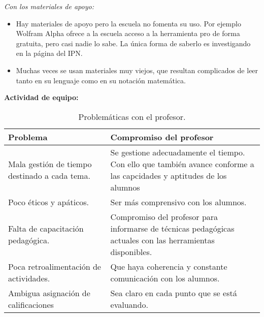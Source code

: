 \documentclass[12pt]{report}
\newcounter{it}
\theoremstyle{largebreak}
\begin{document}
    \textit{Con los materiales de apoyo:}

    \begin{itemize}
        \item Hay materiales de apoyo pero la escuela no fomenta su uso. Por ejemplo Wolfram Alpha ofrece a la escuela acceso a la herramienta pro de forma gratuita, pero casi nadie lo sabe. La única forma de saberlo es investigando en la página del IPN.
        \item Muchas veces se usan materiales muy viejos, que resultan complicados de leer tanto en su lenguaje como en su notación matemática.
    \end{itemize}

    \newpage

    \begin{center}
        \textbf{Actividad de equipo:}
    \end{center}

    \begin{table}[ht]
        \begin{center}
            \begin{tabular}{p{0.4\linewidth} | p{0.6\linewidth}}
                \hline
                \hline
                Problema & Compromiso del profesor \\
                \hline
                \hline
                Mala gestión de tiempo destinado a cada tema. & Se gestione adecuadamente el tiempo. Con ello que también avance conforme a las capcidades y aptitudes de los alumnos \\
                \hline
                Poco éticos y apáticos. & Ser más comprensivo con los alumnos. \\
                \hline
                Falta de capacitación pedagógica. & Compromiso del profesor para informarse de técnicas pedagógicas actuales con las herramientas disponibles. \\
                \hline
                Poca retroalimentación de actividades. & Que haya coherencia y constante comunicación con los alumnos. \\
                \hline 
                Ambigua asignación de calificaciones & Sea claro en cada punto que se está evaluando. \\
                \hline
            \end{tabular}
            \caption{Problemáticas con el profesor.}
        \end{center}
    \end{table}
\end{document}
